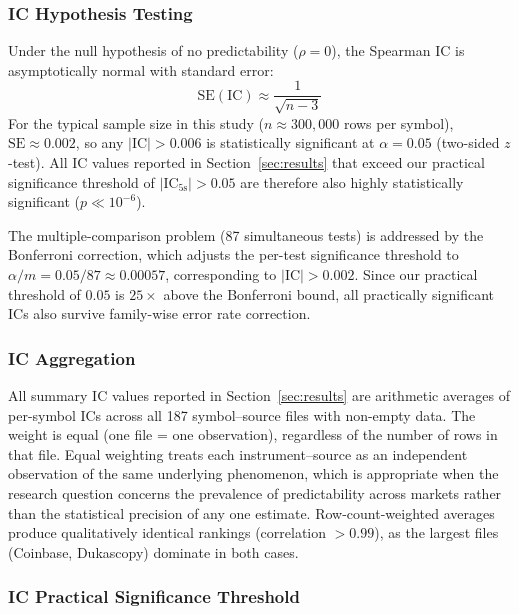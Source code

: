 \documentclass[12pt,a4paper]{article}
\theoremstyle{definition}
\theoremstyle{remark}
\newcommand{\IC}{\mathrm{IC}}
\begin{document}
\subsubsection{IC Hypothesis Testing}

Under the null hypothesis of no predictability ($\rho = 0$), the
Spearman IC is asymptotically normal with standard error:
\begin{equation}
  \mathrm{SE}(\IC) \approx \frac{1}{\sqrt{n-3}}
\label{eq:ics}
\end{equation}
For the typical sample size in this study ($n\approx 300{,}000$ rows
per symbol), $\mathrm{SE}\approx 0.002$, so any $|\IC| > 0.006$
is statistically significant at $\alpha=0.05$ (two-sided $z$-test).
All IC values reported in Section~\ref{sec:results} that exceed our
practical significance threshold of $|\IC_{5\text{s}}|>0.05$ are
therefore also highly statistically significant ($p\ll 10^{-6}$).

The multiple-comparison problem (87 simultaneous tests) is addressed
by the Bonferroni correction, which adjusts the per-test significance
threshold to $\alpha/m = 0.05/87 \approx 0.00057$, corresponding to
$|\IC| > 0.002$. Since our practical threshold of $0.05$ is
$25\times$ above the Bonferroni bound, all practically significant
ICs also survive family-wise error rate correction.

\subsubsection{IC Aggregation}

All summary IC values reported in Section~\ref{sec:results} are
arithmetic averages of per-symbol ICs across all 187 symbol--source
files with non-empty data. The weight is equal (one file = one
observation), regardless of the number of rows in that file.
Equal weighting treats each instrument--source as an independent
observation of the same underlying phenomenon, which is appropriate
when the research question concerns the prevalence of predictability
across markets rather than the statistical precision of any one
estimate. Row-count-weighted averages produce qualitatively identical
rankings (correlation $> 0.99$), as the largest files (Coinbase,
Dukascopy) dominate in both cases.

\subsubsection{IC Practical Significance Threshold}
\end{document}
